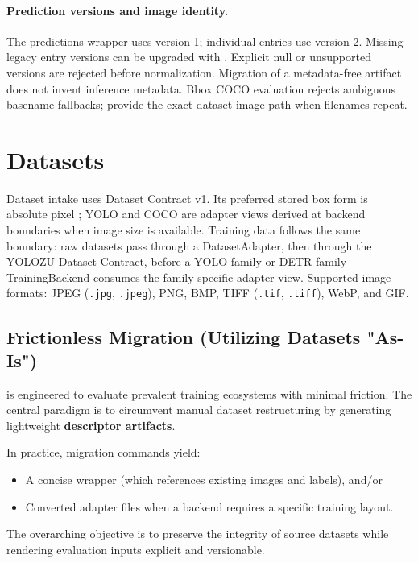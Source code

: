 \paragraph{Prediction versions and image identity.}
The predictions wrapper uses version 1; individual entries use version 2.
Missing legacy entry versions can be upgraded with
. Explicit null or unsupported versions are
rejected before normalization. Migration of a metadata-free artifact does not
invent inference metadata. Bbox COCO evaluation rejects ambiguous basename
fallbacks; provide the exact dataset image path when filenames repeat.

\section{Datasets}
Dataset intake uses Dataset Contract v1. Its preferred stored box form is absolute pixel ; YOLO  and COCO  are adapter views derived at backend boundaries when image size is available.
Training data follows the same boundary: raw datasets pass through a
DatasetAdapter, then through the YOLOZU Dataset Contract, before a YOLO-family
or DETR-family TrainingBackend consumes the family-specific adapter view.
Supported image formats: JPEG (\texttt{.jpg}, \texttt{.jpeg}), PNG, BMP, TIFF (\texttt{.tif}, \texttt{.tiff}), WebP, and GIF.

\subsection{Frictionless Migration (Utilizing Datasets "As-Is")}
\yolozu{} is engineered to evaluate prevalent training ecosystems with minimal friction. The central paradigm is to circumvent manual dataset restructuring by generating lightweight \textbf{descriptor artifacts}.

In practice, migration commands yield:
\begin{itemize}
  \item A concise  wrapper (which references existing images and labels), and/or
  \item Converted adapter files when a backend requires a specific training layout.
\end{itemize}

The overarching objective is to preserve the integrity of source datasets while rendering evaluation inputs explicit and versionable.

